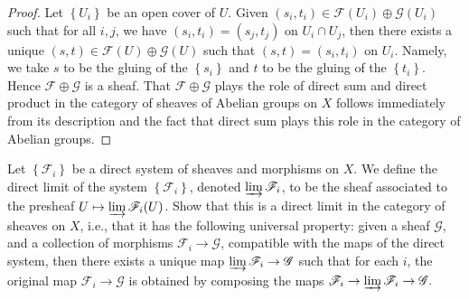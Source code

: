 \begin{proof}
	Let $\left\{U_{i}\right\}$ be an open cover of $U$. Given $\left(s_{i}, t_{i}\right) \in \mathscr{F}\left(U_{i}\right) \oplus \mathscr{G}\left(U_{i}\right)$ such that for all $i, j$, we have $\left(s_{i}, t_{i}\right)=\left(s_{j}, t_{j}\right)$ on $U_{i} \cap U_{j}$, then there exists a unique $(s, t) \in \mathscr{F}(U) \oplus \mathscr{G}(U)$ such that $(s, t)=\left(s_{i}, t_{i}\right)$ on $U_{i} .$ Namely, we take $s$ to be the gluing of the $\left\{s_{i}\right\}$ and $t$ to be the gluing of the $\left\{t_{i}\right\} .$ Hence $\mathscr{F} \oplus \mathscr{G}$ is a sheaf.    
	That $\mathscr{F} \oplus \mathscr{G}$ plays the role of direct sum and direct product in the category of sheaves of Abelian groups on $X$ follows immediately from its description and the fact that direct sum plays this role in the category of Abelian groups.
\end{proof}

\begin{exe}
	\label{2.1.10}
	Let $\left\{\mathscr{F}_{i}\right\}$ be a direct system of sheaves and morphisms on $X .$ We define the direct limit of the system $\left\{\mathscr{F}_{i}\right\}$, denoted $\varinjlim\mathscr{F}_{i}$, to be the sheaf associated to the presheaf $U \mapsto \varinjlim \mathscr{F}_{i}(U)$. Show that this is a direct limit in the category of sheaves on $X$, i.e., that it has the following universal property: given a sheaf $\mathscr{G}$, and a collection of morphisms $\mathscr{F}_{i} \rightarrow \mathscr{G}$, compatible with the maps of the direct
	system, then there exists a unique map $\varinjlim \mathscr{F}_{i} \rightarrow \mathscr{G}$ such that for each $i$, the original map $\mathscr{F}_{i} \rightarrow \mathscr{G}$ is obtained by composing the maps $\mathscr{F}_{i} \rightarrow \varinjlim \mathscr{F}_{i} \rightarrow \mathscr{G} .$
\end{exe}

